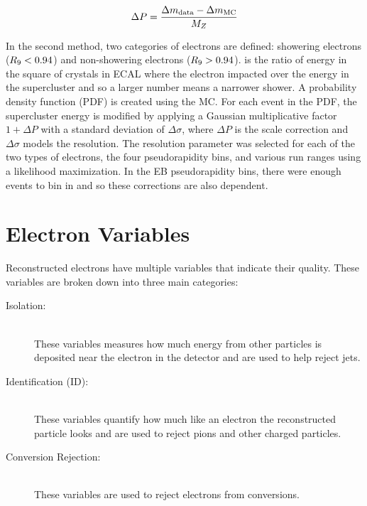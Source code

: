 \begin{equation} \label{eq:scale_correction}
    \Delta P = \frac{\Delta m_{\text{data}} - \Delta m_{\text{MC}}}{M_{Z}}
\end{equation}

In the second method, two categories of electrons are defined: showering
electrons ($R_{9} < 0.94$) and non-showering electrons ($R_{9} > 0.94$).
\RNine is the ratio of energy in the \threebythree square of crystals in ECAL
where the electron impacted over the energy in the supercluster and so a larger
number means a narrower shower. A probability density function (PDF) is created
using the \Ztoee MC. For each event in the PDF, the supercluster energy is
modified by applying a Gaussian multiplicative factor $1+\Delta P$ with a
standard deviation of $\Delta \sigma$, where $\Delta P$ is the scale correction
and $\Delta \sigma$ models the resolution. The resolution parameter was
selected for each of the two types of electrons, the four pseudorapidity bins,
and various run ranges using a likelihood maximization. In the EB
pseudorapidity bins, there were enough events to bin in \ET and so these
corrections are also \ET dependent.

\section{Electron Variables}
\label{sec:electron_variables}

Reconstructed electrons have multiple variables that indicate their quality.
These variables are broken down into three main categories:

\begin{description}
    \item[Isolation:] \hfill \\
        These variables measures how much energy from other particles is
        deposited near the electron in the detector and are used to help reject
        jets.
    \item[Identification (ID):] \hfill \\
        These variables quantify how much like an electron the reconstructed
        particle looks and are used to reject pions and other charged
        particles.
    \item[Conversion Rejection:] \hfill \\
        These variables are used to reject electrons from \photontoee
        conversions.
\end{description}

